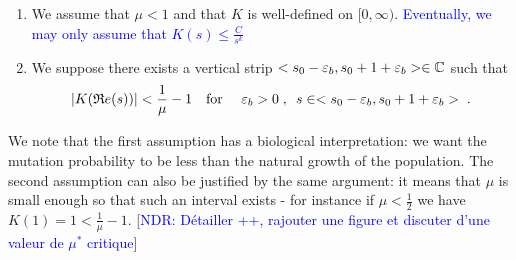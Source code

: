 \documentclass[11pt]{amsart}
\renewcommand{\Re}{\mathfrak{R}e}
\newcommand{\blue}[1]{\textcolor{blue}{#1}}
\begin{document}
\begin{hypothesis}\label{hyp:boundK}
    \begin{enumerate}
        \item We assume that $\mu < 1$ and that $K$ is well-defined on $[0, \infty)$.  \blue{Eventually, we may only assume that $K(s) \leq \frac{C}{s^k}$} 
        \item We suppose there exists a vertical strip $<s_0-\varepsilon_b, s_0+1+\varepsilon_b> \in \mathbb{C}$ such that 
        $$|K(\Re(s))| < \frac{1}{\mu} - 1
        \mtext{for } \varepsilon_b > 0 \eqsepv s \in <s_0-\varepsilon_b, s_0+1+\varepsilon_b>\eqfinp$$ 
    \end{enumerate}
\end{hypothesis}
We note that the first assumption has a biological interpretation: we want the mutation probability to be less than the natural growth of the population. The second assumption can also be justified by the same argument: it means that $\mu$ is small enough so that  such an interval exists - for instance if $\mu<\frac{1}{2}$ we have $K(1)=1<\frac{1}{\mu}-1.$  [\blue{NDR: Détailler ++, rajouter une figure et discuter d'une valeur de $\mu^* $ critique}]
\end{document}
